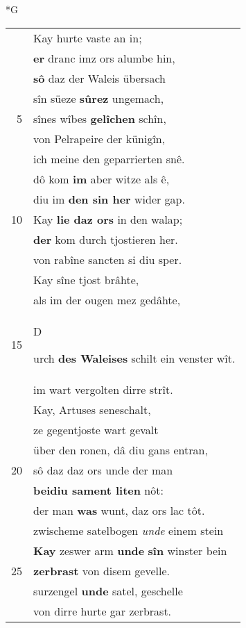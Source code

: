 \documentclass[8pt,a4paper,notitlepage]{article}
\begin{document}
\newpage
\begin{table}[ht]
\begin{minipage}[t]{0.5\linewidth}
\small
\begin{center}*G
\end{center}
\begin{tabular}{rl}
 & Kay hurte vaste an in;\\ 
 & \textbf{er} dranc imz ors alumbe hin,\\ 
 & \textbf{sô} daz der Waleis übersach\\ 
 & sîn süeze \textbf{sûrez} ungemach,\\ 
5 & sînes wîbes \textbf{gelîchen} schîn,\\ 
 & von Pelrapeire der künigîn,\\ 
 & ich meine den geparrierten snê.\\ 
 & dô kom \textbf{im} aber witze als ê,\\ 
 & diu im \textbf{den sin her} wider gap.\\ 
10 & Kay \textbf{lie daz ors} in den walap;\\ 
 & \textbf{der} kom durch tjostieren her.\\ 
 & von rabîne sancten si diu sper.\\ 
 & Kay sîne tjost brâhte,\\ 
 & als im der ougen mez gedâhte,\\ 
15 & \begin{large}D\end{large}urch \textbf{des Waleises} schilt ein venster wît.\\ 
 & im wart vergolten dirre strît.\\ 
 & Kay, Artuses seneschalt,\\ 
 & ze gegentjoste wart gevalt\\ 
 & über den ronen, dâ diu gans entran,\\ 
20 & sô daz daz ors unde der man\\ 
 & \textbf{beidiu sament liten} nôt:\\ 
 & der man \textbf{was} wunt, daz ors lac tôt.\\ 
 & zwischeme satelbogen \textit{unde} einem stein\\ 
 & \textbf{Kay} zeswer arm \textbf{unde} \textbf{sîn} winster bein\\ 
25 & \textbf{zerbrast} von disem gevelle.\\ 
 & surzengel \textbf{unde} satel, geschelle\\ 
 & von dirre hurte gar zerbrast.\\ 

\end{tabular}
\end{minipage}
\end{table}
\end{document}

